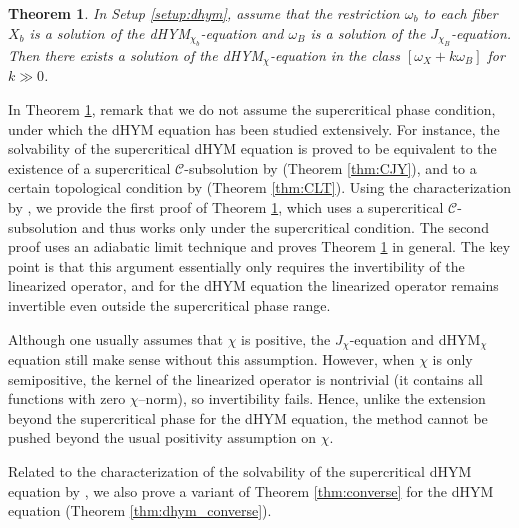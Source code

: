 \documentclass{amsart}
\numberwithin{equation}{section}
\theoremstyle{plain}
\newtheorem{theorem}[equation]{Theorem}
\theoremstyle{definition}
\theoremstyle{remark}
\begin{document}
\begin{theorem}\label{thm:dhym_main}
    In Setup \ref{setup:dhym}, assume that 
    the restriction $\omega_b$ to each fiber $X_b$ is a solution of the dHYM$_{\chi_b}$-equation and   
    $\omega_B$ is a solution of the $J_{\chi_B}$-equation.
    Then there exists a solution of the dHYM$_\chi$-equation in the class $[ {\omega_X} + k \omega_B]$ for $k \gg 0$.
\end{theorem}

In Theorem \ref{thm:dhym_main}, remark that we do not assume the supercritical phase condition, under which the dHYM equation has been studied extensively. 
For instance, the solvability of the supercritical dHYM equation is proved to be equivalent to the existence of a supercritical $\mathcal{C}$-subsolution by \cite{CJY} (Theorem \ref{thm:CJY}), and
to a certain topological condition by \cite{G.Chen, CLT} (Theorem \ref{thm:CLT}). 
Using the characterization by \cite{CJY}, we provide the first proof of Theorem \ref{thm:dhym_main}, which uses a supercritical $\mathcal{C}$-subsolution and thus works only under the supercritical condition. The second proof uses an adiabatic limit technique and proves Theorem \ref{thm:dhym_main} in general. The key point is that this argument essentially only requires the invertibility of the linearized operator, and for the dHYM equation the linearized operator remains invertible even outside the supercritical phase range.

Although one usually assumes that $\chi$ is positive, the $J_\chi$-equation and dHYM$_\chi$ equation still make sense without this assumption. However, when $\chi$ is only semipositive, the kernel of the linearized operator is nontrivial (it contains all functions with zero $\chi$–norm), so invertibility fails. Hence, unlike the extension beyond the supercritical phase for the dHYM equation, the method cannot be pushed beyond the usual positivity assumption on $\chi$.

Related to the characterization of the solvability of the supercritical dHYM equation by \cite{CLT}, we also prove a variant of Theorem \ref{thm:converse} for the dHYM equation (Theorem \ref{thm:dhym_converse}).
\end{document}
